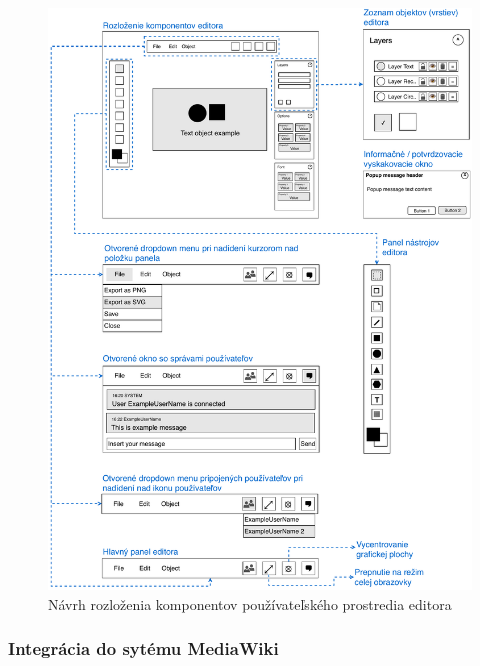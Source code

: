 \begin{figure}[h]
	\centerline{\includegraphics[width=1\textwidth]{images/diagrams/editor_wireframe_base}}
	\caption[Rozloženie komponentov editora]{Návrh rozloženia komponentov používateľského prostredia editora}
	\label{obr:editor_wireframe_base}
\end{figure}
\FloatBarrier

\subsubsection{Integrácia do sytému MediaWiki}
